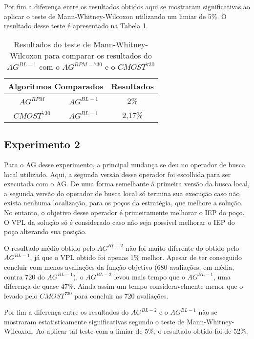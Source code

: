 Por fim a diferença entre os resultados obtidos aqui se mostraram significativas ao aplicar o teste de Mann-Whitney-Wilcoxon utilizando um limiar de 5\%. O resultado desse teste é apresentado na Tabela \ref{tab:mw6_2}.

\begin{table}[htb]
\centering
\caption{Resultados do teste de Mann-Whitney-Wilcoxon para comparar os resultados do $AG^{BL-1}$ com o $AG^{RPM-730}$ e o $CMOST^{730}$}
\label{tab:mw6_2}
\begin{tabular}{|c|c|c|}
\hline
\multicolumn{2}{|c|}{Algoritmos Comparados} & Resultados \\ \hline
$AG^{RPM}$  &  $AG^{BL-1}$ & 2\% \\ \hline
$CMOST^{730}$ & $AG^{BL-1}$ & 2,17\% \\ \hline

\end{tabular}
\end{table}

\subsection{Experimento 2}

Para o AG desse experimento, a principal mudança se deu no operador de busca local utilizado. Aqui, a segunda versão desse operador foi escolhida para ser executada com o AG. De uma forma semelhante à primeira versão da busca local, a segunda versão do operador de busca local só termina sua execução caso não exista nenhuma localização, para os poços da estratégia, que melhore a solução. No entanto, o objetivo desse operador é primeiramente melhorar o IEP do poço. O VPL da solução só é considerado caso não seja possível melhorar o IEP do poço alterando sua posição.

O resultado médio obtido pelo $AG^{BL-2}$ não foi muito diferente do obtido pelo $AG^{BL-1}$, já que o VPL obtido foi apenas 1\% melhor. Apesar de ter conseguido concluir com menos avaliações da função objetivo (680 avaliações, em média, contra 720 do $AG^{BL-1}$), o $AG^{BL-2}$ levou mais tempo que o $AG^{BL-1}$, uma diferença de quase 47\%. Ainda assim um tempo consideravelmente menor que o levado pelo $CMOST^{730}$ para concluir as 720 avaliações.

Por fim a diferença entre os resultados do $AG^{BL-2}$ e o $AG^{BL-1}$ não se mostraram estatisticamente significativas segundo o teste de Mann-Whitney-Wilcoxon. Ao aplicar tal teste com a limiar de 5\%, o resultado obtido foi de 52\%.
